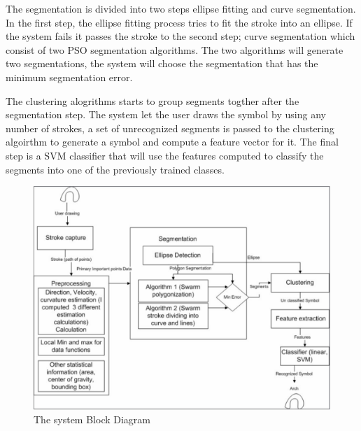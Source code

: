 \documentclass[a4paper,10pt]{IEEEconf}
\begin{document}
The segmentation is divided into two steps ellipse fitting and  curve segmentation. In the first step, the ellipse fitting process tries to fit the stroke into an ellipse. If the system fails it passes the stroke to the second step; curve segmentation which consist of two PSO segmentation algorithms. The two algorithms will generate two segmentations, the system will choose the segmentation that has the minimum segmentation error.%

 The clustering alogrithms starts to group segments togther after the segmentation step. The system let the user draws the symbol by using any number of strokes, a set of unrecognized segments is passed to the clustering algoirthm to generate a symbol and compute a feature vector for it.  The final step is a SVM classifier that will use the features computed to classify the segments into one of the previously trained classes. %
 
\begin{figure}[]
	\centering
		\includegraphics[scale=0.35]{images/Blockdiagram.pdf}
	\caption[  ]{The system Block Diagram}
	\label{fig:Blockdiagram}
\end{figure}
\end{document}
